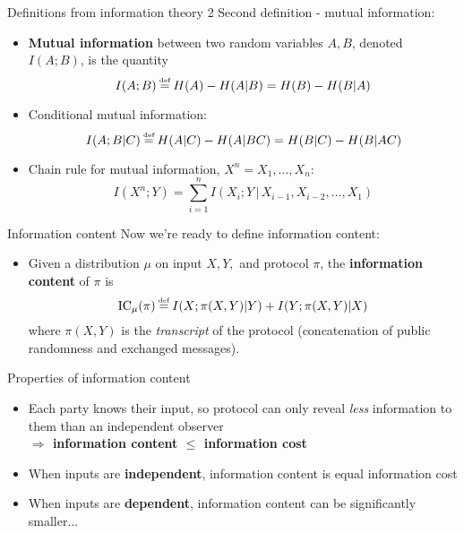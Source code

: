 \documentclass[10pt]{beamer}
\newcommand\IC{\textrm{IC}}
\newcommand\defeq{\mathrel{\stackrel{\makebox[0pt]{\mbox{\normalfont\tiny def}}}{=}}}
\begin{document}
\begin{frame}{Definitions from information theory 2}
Second definition - mutual information:
\pause
    \begin{itemize}
        \item \textbf{Mutual information} between two random variables $A, B$, denoted $I(A;B)$, is the quantity
        $$ I(A;B) \defeq H(A) - H(A|B) = H(B) - H(B|A) $$
        \pause
        \item Conditional mutual information:
        $$ I(A;B|C) \defeq H(A|C) - H(A|BC) = H(B|C) - H(B|AC) $$
        \pause
        \item Chain rule for mutual information, $X^n = X_1,\ldots,X_n$:
        $$ I(X^n;Y) = \sum_{i = 1}^n I(X_i;Y \,|\, X_{i-1}, X_{i-2}, \ldots, X_{1})$$
        
    \end{itemize}
\end{frame}

\begin{frame}{Information content}
Now we're ready to define information content:
    \begin{itemize}
        \pause
        \item Given a distribution $\mu$ on input $X, Y,$ and protocol $\pi$, the \textbf{information content} of $\pi$ is
        $$ \IC_\mu(\pi) \defeq I(X; \pi(X,Y)|Y) + I(Y; \pi(X,Y)|X) $$
        where $\pi(X, Y)$ is the \textit{transcript} of the protocol (concatenation of public randomness and exchanged messages).
\end{itemize}
\end{frame}

\begin{frame}{Properties of information content}
\begin{itemize}
    \pause
    \item Each party knows their input, so protocol can only reveal \textit{less} information to them than an independent observer
    \\ \textbf{$\Rightarrow$ information content $\leq$ information cost}
    \vskip 0.6cm
        \pause
    \item When inputs are \textbf{independent}, information content is equal information cost
    \vskip 0.6cm
        \pause
    \item When inputs are \textbf{dependent}, information content can be significantly smaller...
\end{itemize}
\end{frame}
\end{document}
